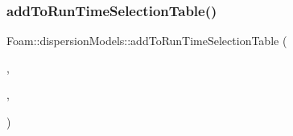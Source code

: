 \mbox{\label{namespaceFoam_1_1dispersionModels_a8dda138300c4d7741ccc5321b66a26e3}} 
\subsubsection{\texorpdfstring{add\+To\+Run\+Time\+Selection\+Table()}{addToRunTimeSelectionTable()}}
{\footnotesize\ttfamily Foam\+::dispersion\+Models\+::add\+To\+Run\+Time\+Selection\+Table (\begin{DoxyParamCaption}\item[{\hyperlink{classFoam_1_1dispersionModel}{dispersion\+Model}}]{,  }\item[{\hyperlink{classFoam_1_1dispersionModels_1_1constant}{constant}}]{,  }\item[{dispersion\+Models}]{ }\end{DoxyParamCaption})}

